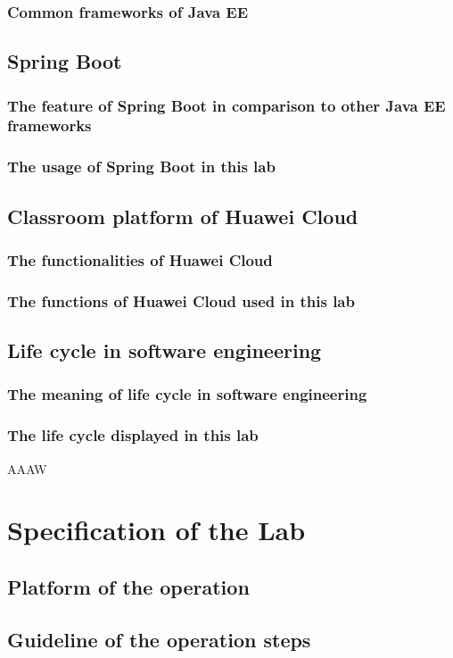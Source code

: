 \documentclass[a4paper]{report}
\begin{document}
\subsection{Common frameworks of Java EE}
\section{Spring Boot}
\subsection{The feature of Spring Boot in comparison to other Java EE frameworks}
\subsection{The usage of Spring Boot in this lab}
\section{Classroom platform of Huawei Cloud}
\subsection{The functionalities of Huawei Cloud}
\subsection{The functions of Huawei Cloud used in this lab}
\section{Life cycle in software engineering}
\subsection{The meaning of life cycle in software engineering}
\subsection{The life cycle displayed in this lab}
AAAW
\chapter{Specification of the Lab}
\section{Platform of the operation}
\section{Guideline of the operation steps}
\end{document}
